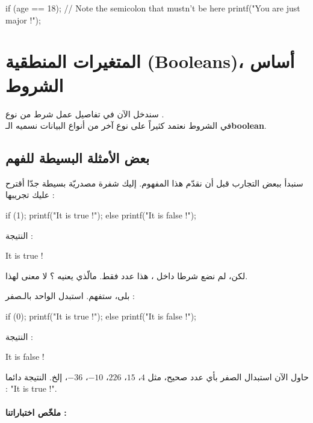 \begin{Csource}
if (age == 18); // Note the semicolon that mustn't be here
{
	printf("You are just major !");
}
\end{Csource}

\section{المتغيرات المنطقية (\textenglish{Booleans})، أساس الشروط}
سندخل الآن في تفاصيل عمل شرط من نوع
.\\
في الشروط نعتمد كثيراً على نوع آخر من أنواع البيانات نسميه الـ\textbf{\textenglish{boolean}}.

\subsection{بعض الأمثلة البسيطة للفهم}

سنبدأ ببعض التجارب قبل أن نقدّم هذا المفهوم. إليك شفرة مصدريّة بسيطة جدّا أقترح عليك تجريبها :

\begin{Csource}
if (1);
{
	printf("It is true !");
}
else
{
	printf("It is false !");
}
\end{Csource}

النتيجة : 

\begin{Console}
It is true !
\end{Console}

\begin{question}
لكن، لم نضع شرطا داخل
،
هذا عدد فقط. مالّذي يعنيه ؟ لا معنى لهذا.
\end{question}

بلى، ستفهم. استبدل الواحد بالـصفر :

\begin{Csource}
if (0);
{
	printf("It is true !");
}
else
{
	printf("It is false !");
}
\end{Csource}

النتيجة :
\begin{Console}
It is false !
\end{Console}

حاول الآن استبدال الصفر بأي عدد صحيح، مثل $ 4 $، $ 15 $، $ 226 $، $ -10 $، $ -36 $، إلخ. النتيجة دائما :
"\textenglish{It is true !}".

\paragraph{ملخّص اختباراتنا :}


